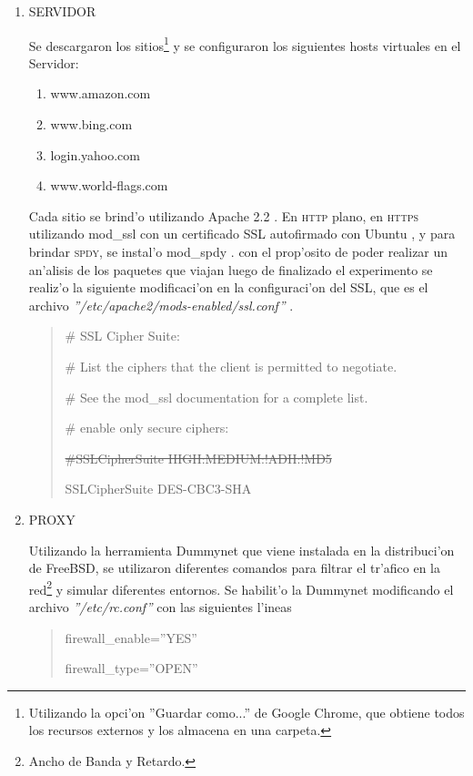 \documentclass[a4paper,11pt,twocolumn]{article}
\begin{document}
\begin{enumerate}
\item SERVIDOR

Se descargaron los sitios\footnote{Utilizando la opci'on ''Guardar como...'' de Google Chrome, que obtiene todos los recursos externos y los almacena en una carpeta.} y se configuraron los siguientes hosts virtuales en el Servidor:
\begin{enumerate}
\item www.amazon.com
\item www.bing.com
\item login.yahoo.com
\item www.world-flags.com \cite{flags}
\end{enumerate}
Cada sitio se brind'o utilizando Apache 2.2 \cite{apache}. En \textsc{http} plano, en \textsc{https} utilizando mod\_ssl \cite{modSSL} con un certificado SSL autofirmado con Ubuntu \cite[Secci'on 4]{spdyGT}, y para brindar \textsc{spdy}, se instal'o mod\_spdy \cite{modSPDY}. con el prop'osito de poder realizar un an'alisis de los paquetes que viajan luego de finalizado el experimento se realiz'o la siguiente modificaci'on en la configuraci'on del SSL, que es el archivo \emph{''/etc/apache2/mods-enabled/ssl.conf''} \cite{siffSSL}.

\begin{quote}\small
\#   SSL Cipher Suite:

\#   List the ciphers that the client is permitted to negotiate.

\#   See the mod\_ssl documentation for a complete list.

\#   enable only secure ciphers:

\sout{\#SSLCipherSuite HIGH:MEDIUM:!ADH:!MD5}

SSLCipherSuite DES-CBC3-SHA
\end{quote}

\item PROXY

Utilizando la herramienta Dummynet \cite{dummynet} que viene instalada en la distribuci'on de FreeBSD, se utilizaron diferentes comandos \cite{ipfw} para filtrar el tr'afico en la red\footnote{Ancho de Banda y Retardo.} y simular diferentes entornos. Se habilit'o la Dummynet modificando el archivo \emph{''/etc/rc.conf''} con las siguientes l'ineas

\begin{quote}\small
firewall\_enable=''YES''

firewall\_type=''OPEN''


\end{quote}
\end{enumerate}
\end{document}
